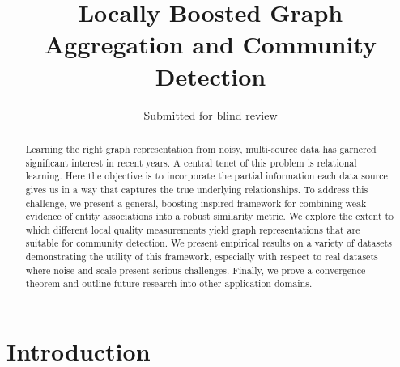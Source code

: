 \documentclass{IEEEtran}
\begin{document}
\title{Locally Boosted Graph Aggregation and Community Detection}

\author[]{Submitted for blind review}


\date{}

\maketitle

\begin{abstract} \small \baselineskip=9pt 
Learning the right graph representation from noisy, multi-source data has
garnered significant interest in recent years. A central tenet of this problem
is relational learning. Here the objective is to incorporate the partial
information each data source gives us in a way that captures the true
underlying relationships. To address this challenge, we present a general,
boosting-inspired framework for combining weak evidence of entity associations
into a robust similarity metric. We explore the extent to which different local
quality measurements yield graph representations that are suitable for
community detection. We present empirical results on a variety of datasets
demonstrating the utility of this framework, especially with respect to real
datasets where noise and scale present serious challenges. Finally, we prove a
convergence theorem and outline future research into other application domains.
\end{abstract}
 
\section{Introduction}
\end{document}
